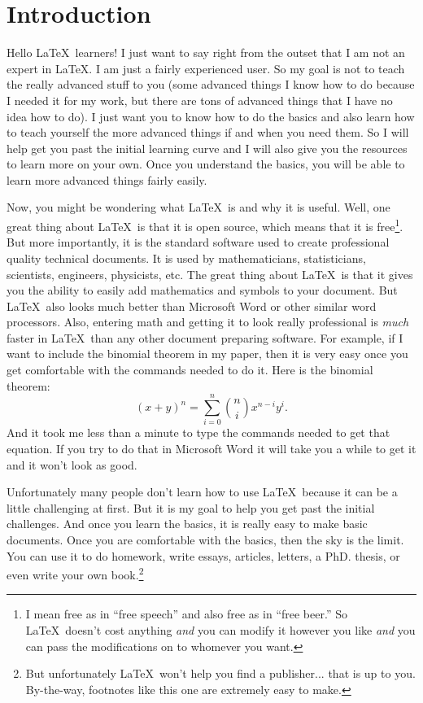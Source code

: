 \documentclass[11pt]{article}
\begin{document}
\section{Introduction}
Hello \LaTeX\ learners!  I just want to say right from the outset that I am not an expert in \LaTeX.  I am just a fairly experienced user.  So my goal is not to teach the really advanced stuff to you (some advanced things I know how to do because I needed it for my work, but there are tons of advanced things that I have no idea how to do).  I just want you to know how to do the basics and also learn how to teach yourself the more advanced things if and when you need them.  So I will help get you past the initial learning curve and I will also give you the resources to learn more on your own.  Once you understand the basics, you will be able to learn more advanced things fairly easily.

Now, you might be wondering what \LaTeX\ is and why it is useful. Well, one great thing about \LaTeX\ is that it is open source, which means that it is free\footnote{I mean free as in ``free speech'' and also free as in ``free beer.''  So \LaTeX\ doesn't cost anything \emph{and} you can modify it however you like \emph{and} you can pass the modifications on to whomever you want.}.  But more importantly, it is the standard software used to create professional quality technical documents.   It is used by mathematicians, statisticians, scientists, engineers, physicists, etc. The great thing about \LaTeX\ is that it gives you the ability to easily add mathematics and symbols to your document. But \LaTeX\ also looks much better than Microsoft Word or other similar word processors. Also, entering math and getting it to look really professional is \emph{much} faster in \LaTeX\ than any other document preparing software.  For example, if I want to include the binomial theorem in my paper, then it is very easy once you get comfortable with the commands needed to do it. Here is the binomial theorem:
\[
(x+y)^n=\sum_{i=0}^{n} \binom{n}{i} x^{n-i}y^i.
\]
And it took me less than a minute to type the commands needed to get that equation. If you try to do that in Microsoft Word it will take you a while to get it and it won't look as good.

Unfortunately many people don't learn how to use \LaTeX\ because it can be a little challenging at first.  But it is my goal to help you get past the initial challenges. And once you learn the basics, it is really easy to make basic documents. Once you are comfortable with the basics, then the sky is the limit.  You can use it to do homework, write essays, articles, letters, a PhD. thesis, or even write your own book.\footnote{But unfortunately \LaTeX\ won't help you find a publisher... that is up to you.  By-the-way, footnotes like this one are extremely easy to make.}
\end{document}
